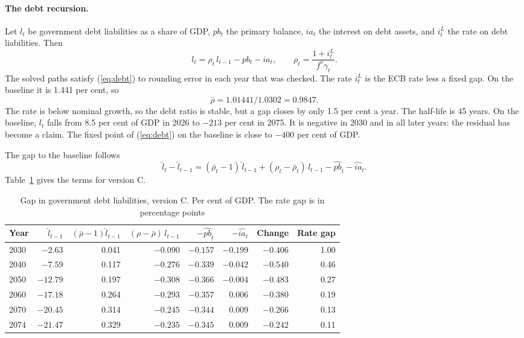 \documentclass[11pt,a4paper]{article}
\begin{document}
\paragraph{The debt recursion.}
Let $l_t$ be government debt liabilities as a share of GDP, $pb_t$ the primary balance, $ia_t$ the interest on debt assets, and $i^L_t$ the rate on debt liabilities. Then
\begin{equation}
l_t = \rho_t\, l_{t-1} - pb_t - ia_t , \qquad \rho_t = \frac{1 + i^L_t}{f^v \gamma_t} .
\label{eq:debt}
\end{equation}
The solved paths satisfy (\ref{eq:debt}) to rounding error in each year that was checked.
The rate $i^L_t$ is the ECB rate less a fixed gap. On the baseline it is 1.441 per cent, so
\[
\bar{\rho} = 1.01441 / 1.0302 = 0.9847 .
\]
The rate is below nominal growth, so the debt ratio is stable, but a gap closes by only 1.5 per cent a year. The half-life is 45 years.
On the baseline, $l_t$ falls from 8.5 per cent of GDP in 2026 to $-213$ per cent in 2075. It is negative in 2030 and in all later years: the residual has become a claim. The fixed point of (\ref{eq:debt}) on the baseline is close to $-400$ per cent of GDP.

The gap to the baseline follows
\begin{equation}
\hat{l}_t - \hat{l}_{t-1} = (\bar{\rho}_t - 1)\, \hat{l}_{t-1} + (\rho_t - \bar{\rho}_t)\, l_{t-1} - \widehat{pb}_t - \widehat{ia}_t .
\label{eq:debtgap}
\end{equation}
Table~\ref{tab:debt} gives the terms for version C.

\begin{table}[ht]
\centering
\small
\caption{Gap in government debt liabilities, version C. Per cent of GDP. The rate gap is in percentage points}
\label{tab:debt}
\begin{tabular}{@{}lrrrrrrr@{}}
\toprule
Year & $\hat{l}_{t-1}$ & $(\bar{\rho}-1)\hat{l}_{t-1}$ & $(\rho-\bar{\rho})\,l_{t-1}$ & $-\widehat{pb}_t$ & $-\widehat{ia}_t$ & Change & Rate gap \\
\midrule
2030 & $-2.63$ & 0.041 & $-0.090$ & $-0.157$ & $-0.199$ & $-0.406$ & 1.00 \\
2040 & $-7.59$ & 0.117 & $-0.276$ & $-0.339$ & $-0.042$ & $-0.540$ & 0.46 \\
2050 & $-12.79$ & 0.197 & $-0.308$ & $-0.366$ & $-0.004$ & $-0.483$ & 0.27 \\
2060 & $-17.18$ & 0.264 & $-0.293$ & $-0.357$ & 0.006 & $-0.380$ & 0.19 \\
2070 & $-20.45$ & 0.314 & $-0.245$ & $-0.344$ & 0.009 & $-0.266$ & 0.13 \\
2074 & $-21.47$ & 0.329 & $-0.235$ & $-0.345$ & 0.009 & $-0.242$ & 0.11 \\
\bottomrule
\end{tabular}
\end{table}
\end{document}
